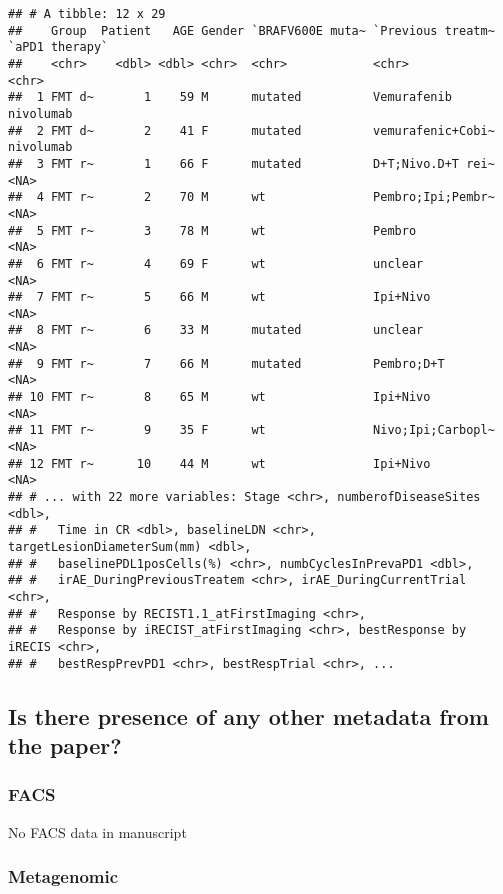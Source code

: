 \documentclass[
]{article}
\begin{document}
\begin{verbatim}
## # A tibble: 12 x 29
##    Group  Patient   AGE Gender `BRAFV600E muta~ `Previous treatm~ `aPD1 therapy`
##    <chr>    <dbl> <dbl> <chr>  <chr>            <chr>             <chr>         
##  1 FMT d~       1    59 M      mutated          Vemurafenib       nivolumab     
##  2 FMT d~       2    41 F      mutated          vemurafenic+Cobi~ nivolumab     
##  3 FMT r~       1    66 F      mutated          D+T;Nivo.D+T rei~ <NA>          
##  4 FMT r~       2    70 M      wt               Pembro;Ipi;Pembr~ <NA>          
##  5 FMT r~       3    78 M      wt               Pembro            <NA>          
##  6 FMT r~       4    69 F      wt               unclear           <NA>          
##  7 FMT r~       5    66 M      wt               Ipi+Nivo          <NA>          
##  8 FMT r~       6    33 M      mutated          unclear           <NA>          
##  9 FMT r~       7    66 M      mutated          Pembro;D+T        <NA>          
## 10 FMT r~       8    65 M      wt               Ipi+Nivo          <NA>          
## 11 FMT r~       9    35 F      wt               Nivo;Ipi;Carbopl~ <NA>          
## 12 FMT r~      10    44 M      wt               Ipi+Nivo          <NA>          
## # ... with 22 more variables: Stage <chr>, numberofDiseaseSites <dbl>,
## #   Time in CR <dbl>, baselineLDN <chr>, targetLesionDiameterSum(mm) <dbl>,
## #   baselinePDL1posCells(%) <chr>, numbCyclesInPrevaPD1 <dbl>,
## #   irAE_DuringPreviousTreatem <chr>, irAE_DuringCurrentTrial <chr>,
## #   Response by RECIST1.1_atFirstImaging <chr>,
## #   Response by iRECIST_atFirstImaging <chr>, bestResponse by iRECIS <chr>,
## #   bestRespPrevPD1 <chr>, bestRespTrial <chr>, ...
\end{verbatim}

\hypertarget{is-there-presence-of-any-other-metadata-from-the-paper}{%
\subsection{Is there presence of any other metadata from the
paper?}\label{is-there-presence-of-any-other-metadata-from-the-paper}}

\hypertarget{facs}{%
\subsubsection{FACS}\label{facs}}

No FACS data in manuscript

\hypertarget{metagenomic}{%
\subsubsection{Metagenomic}\label{metagenomic}}
\end{document}
